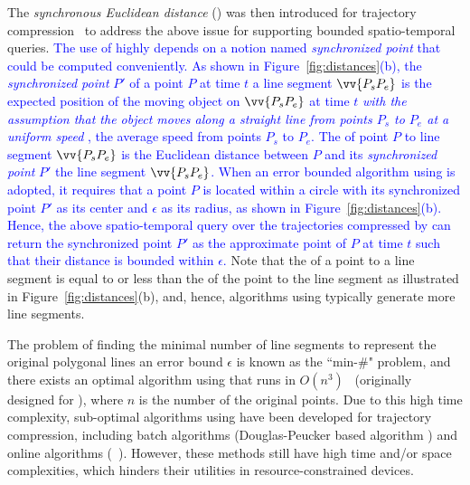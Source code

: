 The \emph{synchronous Euclidean distance} (\sed) was then introduced for trajectory compression~\cite{Meratnia:Spatiotemporal, Cao:Spatio, Potamias:Sampling, Muckell:Compression, Chen:Fast} to address the above issue for supporting bounded spatio-temporal queries.
\textcolor{blue}{The use of \sed highly depends on a notion named \emph{synchronized point} \cite{Meratnia:Spatiotemporal,Cao:Spatio} that could be computed conveniently. As shown in Figure~\ref{fig:distances}(b), the \emph{synchronized point} $P'$ of a point $P$ at time $t$ \wrt a line segment $\vv{P_sP_e}$  is the expected position of the moving object on $\vv{P_sP_e}$ at time $t$ \emph{with the assumption that the object moves along a straight line from points $P_s$ to $P_e$ at a uniform speed} \cite{Cao:Spatio}, \ie the average speed from points $P_s$ to $P_e$.}
\textcolor{blue}{The \sed of point $P$ to line segment $\vv{P_sP_e}$ is the Euclidean distance between $P$ and its \emph{synchronized point} $P'$  \wrt the line segment $\vv{P_sP_e}$.}
\textcolor{blue}{When an error bounded \lsa algorithm using \sed is adopted, it requires that a point $P$ is located within a circle with its synchronized point $P'$  as its center and $\epsilon$ as its radius, as shown in Figure~\ref{fig:distances}(b).}
\textcolor{blue}{Hence, the above spatio-temporal query over the trajectories compressed by \sed can return the synchronized point $P'$ as the approximate point of $P$ at time $t$ such that their distance is bounded within $\epsilon$.}
%
Note that the \sed of a point to a line segment is equal to or less than the \ped of the point to the line segment as illustrated in Figure~\ref{fig:distances}(b), and, hence, \lsa algorithms using \sed typically generate more line segments.




%
%

The problem of finding the minimal number of line segments to represent the original polygonal lines \wrt an error bound $\epsilon$ is known as the ``min-\#" problem\cite{Imai:Optimal,Chan:Optimal}, and there exists an optimal \lsa algorithm using \sed that runs in $O(n^3)$~\cite{Imai:Optimal} (originally designed for \ped ),  where $n$ is the number of the original points.
Due to this high time complexity, sub-optimal \lsa algorithms using \sed have been developed for trajectory compression, including batch algorithms (\eg Douglas-Peucker based algorithm \dpsed \cite{Meratnia:Spatiotemporal}) and online algorithms (\eg\ \squishe \cite{Muckell:Compression}).
However, these methods still have high time and/or space complexities, which hinders their utilities in resource-constrained devices. %


